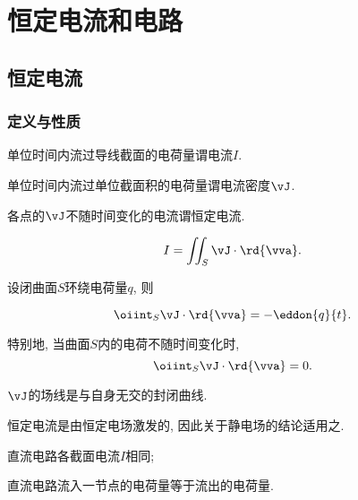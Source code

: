 \documentclass[../Electromagnetism.tex]{subfiles}
\begin{document}
\graphicspath{{ElectricCurrentAndCircuits/src}{src}}

\section{恒定电流和电路} %
\label{sec:恒定电流和电路}

\subsection{恒定电流} %
\label{sub:恒定电流}

\subsubsection{定义与性质} %
\label{ssub:定义与性质}

\begin{definition}[电流]
	单位时间内流过导线截面的电荷量谓电流$I$.
\end{definition}
\begin{definition}[电流密度]
	单位时间内流过单位截面积的电荷量谓电流密度$\vJ$.
\end{definition}
\begin{definition}[恒定电流]
	各点的$\vJ$不随时间变化的电流谓恒定电流.
\end{definition}
\begin{corollary}[电流作为通量]\quad
	\[ I = \iint_S \vJ\cdot\rd{\vva}. \]
\end{corollary}
\begin{corollary}[电荷守恒定律]
	设闭曲面$S$环绕电荷量$q$, 则
	\begin{finale}
		\[ \oiint_S \vJ\cdot\rd{\vva} = -\eddon{q}{t}. \]
	\end{finale}
	特别地, 当曲面$S$内的电荷不随时间变化时,
	\[ \oiint_S \vJ\cdot\rd{\vva} = 0. \]
\end{corollary}
\begin{corollary}[电流线的性质]
	$\vJ$的场线是与自身无交的封闭曲线.
\end{corollary}
\begin{remark}
	恒定电流是由恒定电场激发的, 因此关于静电场的结论适用之.
\end{remark}
\begin{corollary}\quad
	\begin{cenum}
		\item 直流电路各截面电流$I$相同;
		\item 直流电路流入一节点的电荷量等于流出的电荷量.
	\end{cenum}
\end{corollary}
\end{document}
